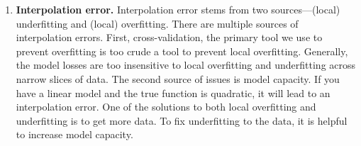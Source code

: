 \documentclass[12pt, letterpaper]{article}
\begin{document}
\begin{enumerate}
   \item  \textbf{Interpolation error.} Interpolation error stems from two sources—(local) underfitting and (local) overfitting. There are multiple sources of interpolation errors. First, cross-validation, the primary tool we use to prevent overfitting is too crude a tool to prevent local overfitting. Generally, the model losses are too insensitive to local overfitting and underfitting across narrow slices of data. The second source of issues is model capacity. If you have a linear model and the true function is quadratic, it will lead to an interpolation error. One of the solutions to both local overfitting and underfitting is to get more data. To fix underfitting to the data, it is helpful to increase model capacity. 
\end{enumerate}
\end{document}
